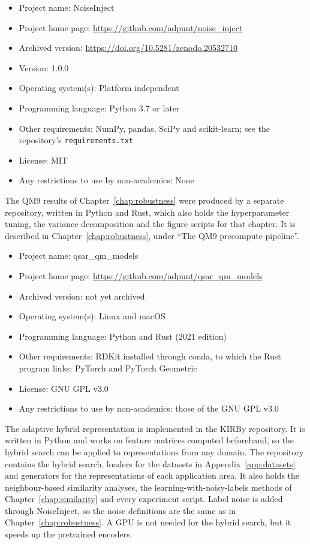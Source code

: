 \begin{itemize}
    \item Project name: NoiseInject
    \item Project home page: \url{https://github.com/adpunt/noise_inject}
    \item Archived version: \url{https://doi.org/10.5281/zenodo.20532710}
    \item Version: 1.0.0
    \item Operating system(s): Platform independent
    \item Programming language: Python 3.7 or later
    \item Other requirements: NumPy, pandas, SciPy and scikit-learn; see the repository's \texttt{requirements.txt}
    \item License: MIT
    \item Any restrictions to use by non-academics: None
\end{itemize}

The QM9 results of Chapter~\ref{chap:robustness} were produced by a separate repository, written in Python and Rust, which also holds the hyperparameter tuning, the variance decomposition and the figure scripts for that chapter. It is described in Chapter~\ref{chap:robustness}, under ``The QM9 precompute pipeline''.

\begin{itemize}
    \item Project name: qsar\_qm\_models
    \item Project home page: \url{https://github.com/adpunt/qsar_qm_models}
    \item Archived version: not yet archived
    \item Operating system(s): Linux and macOS
    \item Programming language: Python and Rust (2021 edition)
    \item Other requirements: RDKit installed through conda, to which the Rust program links; PyTorch and PyTorch Geometric
    \item License: GNU GPL v3.0
    \item Any restrictions to use by non-academics: those of the GNU GPL v3.0
\end{itemize}

The adaptive hybrid representation is implemented in the KIRBy repository. It is written in Python and works on feature matrices computed beforehand, so the hybrid search can be applied to representations from any domain. The repository contains the hybrid search, loaders for the datasets in Appendix~\ref{app:datasets} and generators for the representations of each application area. It also holds the neighbour-based similarity analyses, the learning-with-noisy-labels methods of Chapter~\ref{chap:similarity} and every experiment script. Label noise is added through NoiseInject, so the noise definitions are the same as in Chapter~\ref{chap:robustness}. A GPU is not needed for the hybrid search, but it speeds up the pretrained encoders.

